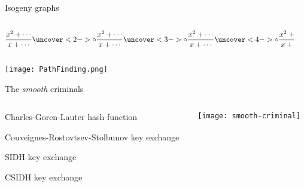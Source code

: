 \documentclass[aspectratio=169]{beamer}
\begin{document}
\begin{frame}{Isogeny graphs}
  \large
  \begin{columns}
    \begin{column}{0.45\textwidth}
      \[
        \frac{x^2 + \cdots}{x + \cdots}
        \uncover<2->{\circ\frac{x^2 + \cdots}{x + \cdots}}
        \uncover<3->{\circ\frac{x^2 + \cdots}{x + \cdots}}
        \uncover<4->{\circ\frac{x^2 + \cdots}{x + \cdots}}
      \]
    \end{column}
    \begin{column}{0.55\textwidth}
      \centering
    \end{column}
  \end{columns}
\end{frame}


\begin{frame}
  \centering
  \texttt{[image: PathFinding.png]}
\end{frame}


\begin{frame}{The \textit{smooth} criminals}
  \Large
  \begin{columns}
    \begin{column}{0.7\textwidth}
      \begin{description}
        \setlength{\itemsep}{1em}
      \item[2006] Charles-Goren-Lauter hash function
      \item[2006] Couveignes-Rostovtsev-Stolbunov key exchange
      \item[2011] SIDH key exchange
      \item[2018] CSIDH key exchange
      \end{description}
    \end{column}
    \begin{column}{0.3\textwidth}
      \texttt{[image: smooth-criminal]}
    \end{column}
  \end{columns}
\end{frame}
\end{document}
